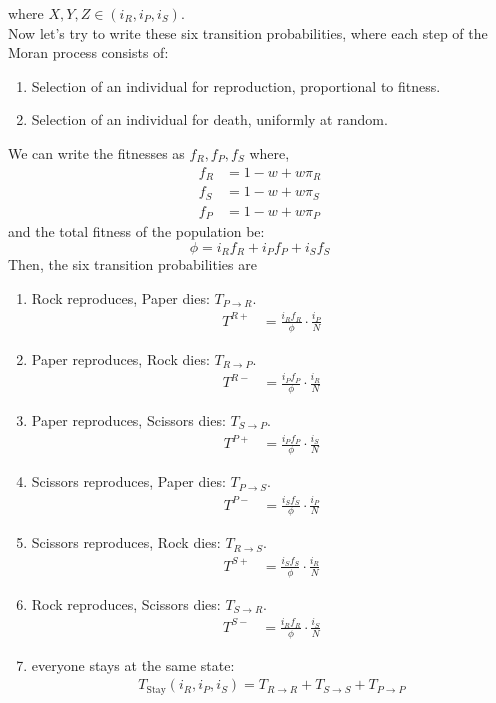 \documentclass{article}
\begin{document}
where $X,Y,Z \in (i_R,i_P,i_S)$.\\
Now let's try to write these six transition probabilities,
where each step of the Moran process consists of:
\begin{enumerate}
\item Selection of an individual for reproduction, proportional to fitness.
\item Selection of an individual for death, uniformly at random.
\end{enumerate}
We can write the fitnesses as \( f_R, f_P, f_S \) where,
\begin{align}
f_R &= 1-w+w\pi_R \nonumber\\
f_S &= 1-w+w\pi_S \nonumber\\
f_P &= 1-w+w\pi_P \label{eq:41}
\end{align}
and the total fitness of the population be:
\begin{equation}
\phi = i_R f_R + i_P f_P + i_S f_S \label{eq:42}
\end{equation}
Then, the six transition probabilities are 
\begin{enumerate}
\item Rock reproduces, Paper dies: $T_{P \to R}$.
\begin{align}
T^{R+} &= \frac{i_R f_R}{\phi} \cdot \frac{i_P}{N} \label{eq:43}
\end{align}
\item Paper reproduces, Rock dies: $T_{R \to P}$.
\begin{align}
T^{R-} &= \frac{i_P f_P}{\phi} \cdot \frac{i_R}{N}\label{eq:44}
\end{align}
\item Paper reproduces, Scissors dies: $T_{S \to P}$.
\begin{align}
T^{P+} &= \frac{i_P f_P}{\phi} \cdot \frac{i_S}{N} \label{eq:45}
\end{align}
\item Scissors reproduces, Paper dies: $T_{P \to S}$.
\begin{align}
T^{P-} &= \frac{i_S f_S}{\phi} \cdot \frac{i_P}{N} \label{eq:46}
\end{align}
\item Scissors reproduces, Rock dies: $T_{R \to S}$.
\begin{align}
T^{S+} &= \frac{i_S f_S}{\phi} \cdot \frac{i_R}{N} \label{eq:47}
\end{align}
\item Rock reproduces, Scissors dies: $T_{S \to R}$.
\begin{align}
T^{S-} &= \frac{i_R f_R}{\phi} \cdot \frac{i_S}{N} \label{eq:48}
\end{align}
\item everyone stays at the same state:
\begin{align}
T_{\text{Stay}}(i_R,i_P,i_S) = T_{R \to R} + T_{S \to S} + T_{P \to P} \label{eq:49}
\end{align}
\end{enumerate}
\end{document}
